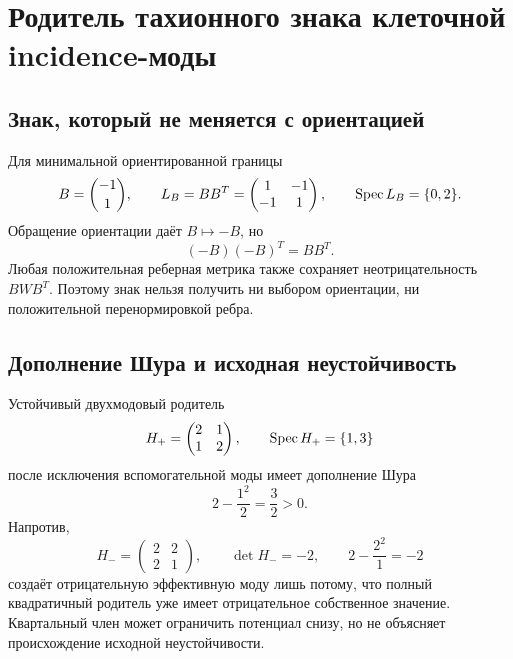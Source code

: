 \chapter{Родитель тахионного знака клеточной incidence-моды}
\label{ch:v10-hopf-reservoir-cell-incidence-tachyonic-sign}

\section{Знак, который не меняется с ориентацией}

Для минимальной ориентированной границы
\begin{equation}
 B=\binom{-1}{1},\qquad L_B=BB^T
 =\begin{pmatrix}1&-1\\-1&1\end{pmatrix},\qquad
 \operatorname{Spec} L_B=\{0,2\}.
\end{equation}
Обращение ориентации даёт $B\mapsto-B$, но
\begin{equation}
 (-B)(-B)^T=BB^T.
\end{equation}
Любая положительная реберная метрика также сохраняет
неотрицательность $BWB^T$. Поэтому знак нельзя получить ни выбором
ориентации, ни положительной перенормировкой ребра.

\section{Дополнение Шура и исходная неустойчивость}

Устойчивый двухмодовый родитель
\begin{equation}
 H_+=\begin{pmatrix}2&1\\1&2\end{pmatrix},\qquad
 \operatorname{Spec} H_+=\{1,3\}
\end{equation}
после исключения вспомогательной моды имеет дополнение Шура
\begin{equation}
 2-\frac{1^2}{2}=\frac32>0.
\end{equation}
Напротив,
\begin{equation}
 H_-=\begin{pmatrix}2&2\\2&1\end{pmatrix},\qquad
 \det H_-=-2,
 \qquad 2-\frac{2^2}{1}=-2
\end{equation}
создаёт отрицательную эффективную моду лишь потому, что полный
квадратичный родитель уже имеет отрицательное собственное значение.
Квартальный член может ограничить потенциал снизу, но не объясняет
происхождение исходной неустойчивости.

